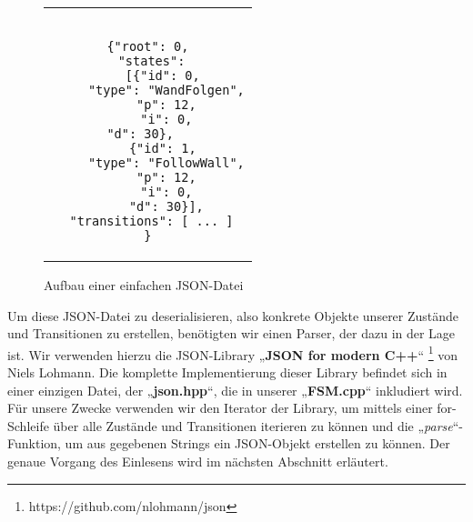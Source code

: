 \begin{figure}[thp]
\begin{tabular}{c}
\begin{lstlisting}[style=json]

{"root": 0,
 "states":
    [{"id": 0,
     "type": "WandFolgen",
     "p": 12,
     "i": 0,
     "d": 30},       
    {"id": 1,
     "type": "FollowWall",
     "p": 12,
     "i": 0,
     "d": 30}],
 "transitions": [ ... ]
}

\end{lstlisting}
\end{tabular}
\centering
\caption{Aufbau einer einfachen JSON-Datei}
\end{figure}

Um diese JSON-Datei zu deserialisieren, also konkrete Objekte unserer Zustände
und Transitionen zu erstellen, benötigten wir einen Parser, der dazu in der Lage
ist. Wir verwenden hierzu die JSON-Library „\textbf{JSON for modern C++}“ \footnote[1]{https://github.com/nlohmann/json} von Niels
Lohmann.
Die komplette Implementierung dieser Library befindet sich in einer einzigen
Datei, der „\textbf{json.hpp}“, die in unserer „\textbf{FSM.cpp}“ inkludiert wird.
Für unsere Zwecke verwenden wir den Iterator der Library, um mittels einer
for-Schleife über alle Zustände und Transitionen iterieren zu können und die
„\textit{parse}“-Funktion, um aus gegebenen Strings ein JSON-Objekt erstellen zu können.
Der genaue Vorgang des Einlesens wird im nächsten Abschnitt erläutert.